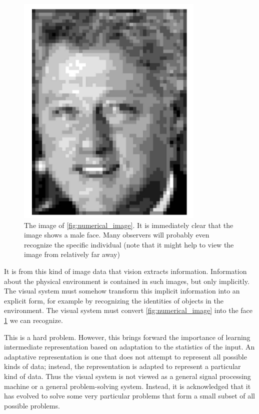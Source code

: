 \documentclass[a4paper]{book}
\begin{document}
    \begin{figure}[h]
      \begin{center}
        \includegraphics[width=0.8\textwidth]{./figures/image_demo.PNG}
        \caption{The image of \cref{fig:numerical_image}. It is
          immediately clear that the image shows a male face. Many
          observers will probably even recognize the specific individual
          (note that it might help to view the image from relatively far
          away)\label{fig:image_demo}}
      \end{center}
    \end{figure}

    It is from this kind of image data that vision extracts information.
    Information about the physical environment is contained in such
    images, but only implicitly. The visual system must somehow transform
    this implicit information into an explicit form, for example by
    recognizing the identities of objects in the environment. The visual
    system must convert \cref{fig:numerical_image} into the face
    \cref{fig:image_demo} we can recognize.

    This is a hard problem. However, this brings forward the importance of
    learning intermediate representation based on adaptation to the
    statistics of the input. An adaptative representation is one that does
    not attempt to represent all possible kinds of data; instead, the
    representation is adapted to represent a particular kind of data. Thus
    the visual system is not viewed as a general signal processing machine
    or a general problem-solving system. Instead, it is acknowledged that
    it has evolved to solve some very particular problems that form a
    small subset of all possible problems.
\end{document}
